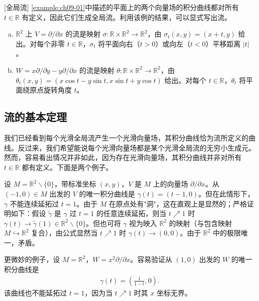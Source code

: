 \documentclass[../../main.tex]{subfiles}
\begin{document}
\begin{example}\label{example:ch09-08}[全局流]
\cref{example:ch09-01}中描述的平面上的两个向量场的积分曲线都对所有 $t\in\mathbb{R}$ 有定义，因此它们生成全局流。利用该例的结果，可以显式写出流。
\begin{enumerate}[(a)]
\item $\mathbb{R}^2$ 上 $V=\partial/\partial x$ 的流是映射 $\sigma\colon\mathbb{R}\times\mathbb{R}^2\to\mathbb{R}^2$，由 $\sigma_t(x,y)=(x+t,y)$ 给出。对每个非零 $t\in\mathbb{R}$，$\sigma_t$ 将平面向右（$t>0$）或向左（$t<0$）平移距离 $|t|$。

\item $W=x\partial/\partial y-y\partial/\partial x$ 的流是映射 $\theta\colon\mathbb{R}\times\mathbb{R}^2\to\mathbb{R}^2$，由 $\theta_t(x,y)=(x\cos t-y\sin t,x\sin t+y\cos t)$ 给出。对每个 $t\in\mathbb{R}$，$\theta_t$ 将平面绕原点旋转角度 $t$。
\end{enumerate}
\end{example}

\subsection*{流的基本定理}

我们已经看到每个光滑全局流产生一个光滑向量场，其积分曲线恰为流所定义的曲线。反过来，我们希望能说每个光滑向量场都是某个光滑全局流的无穷小生成元。然而，容易看出情况并非如此，因为存在光滑向量场，其积分曲线并非对所有 $t\in\mathbb{R}$ 都有定义。下面是两个例子。

\begin{example}\label{example:ch09-09}
设 $M=\mathbb{R}^2\smallsetminus\{0\}$，带标准坐标 $(x,y)$，$V$ 是 $M$ 上的向量场 $\partial/\partial x$。从 $(-1,0)\in M$ 出发的 $V$ 的唯一积分曲线是 $\gamma(t)=(t-1,0)$。但在此情形下，$\gamma$ 不能连续延拓过 $t=1$。由于 $M$ 在原点处有"洞"，这在直观上是显然的；严格证明如下：假设 $\widetilde{\gamma}$ 是 $\gamma$ 过 $t=1$ 的任意连续延拓，则当 $t\nearrow 1$ 时 $\gamma(t)\to\widetilde{\gamma}(1)\in\mathbb{R}^2\smallsetminus\{0\}$。但也可将 $\gamma$ 视为映入 $\mathbb{R}^2$ 的映射（与包含映射 $M\hookrightarrow\mathbb{R}^2$ 复合），由公式显然当 $t\nearrow 1$ 时 $\gamma(t)\to(0,0)$。由于 $\mathbb{R}^2$ 中的极限唯一，矛盾。
\end{example}

\begin{example}\label{example:ch09-10}
更微妙的例子，设 $M=\mathbb{R}^2$，$W=x^2\partial/\partial x$。容易验证从 $(1,0)$ 出发的 $W$ 的唯一积分曲线是
\begin{align*}
\gamma(t)=\left(\frac{1}{1-t},0\right).
\end{align*}
该曲线也不能延拓过 $t=1$，因为当 $t\nearrow 1$ 时其 $x$ 坐标无界。
\end{example}
\end{document}

